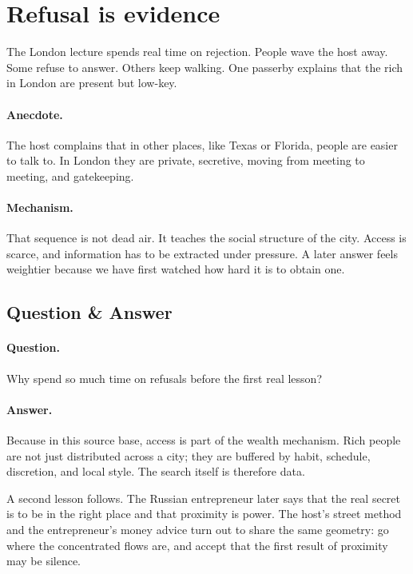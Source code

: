 \documentclass[11pt,oneside]{book}
\begin{document}
\section{Refusal is evidence}

The London lecture spends real time on rejection. People wave the host away. Some refuse to answer. Others keep walking. One passerby explains that the rich in London are present but low-key.

\paragraph{Anecdote.} The host complains that in other places, like Texas or Florida, people are easier to talk to. In London they are private, secretive, moving from meeting to meeting, and gatekeeping.

\paragraph{Mechanism.} That sequence is not dead air. It teaches the social structure of the city. Access is scarce, and information has to be extracted under pressure. A later answer feels weightier because we have first watched how hard it is to obtain one.

\subsection{Question \& Answer}

\paragraph{Question.} Why spend so much time on refusals before the first real lesson?

\paragraph{Answer.} Because in this source base, access is part of the wealth mechanism. Rich people are not just distributed across a city; they are buffered by habit, schedule, discretion, and local style. The search itself is therefore data.

A second lesson follows. The Russian entrepreneur later says that the real secret is to be in the right place and that proximity is power. The host's street method and the entrepreneur's money advice turn out to share the same geometry: go where the concentrated flows are, and accept that the first result of proximity may be silence.
\end{document}
